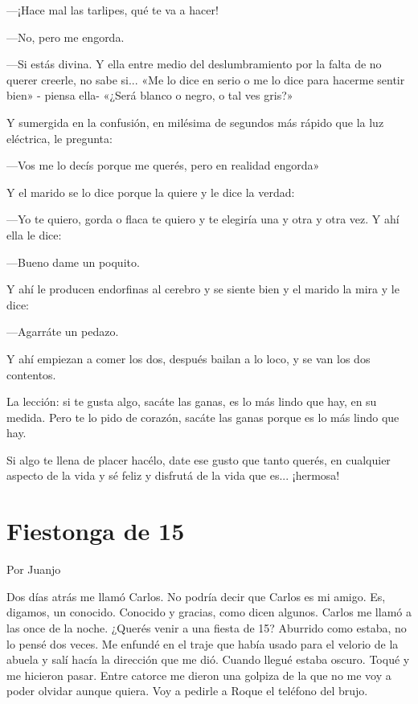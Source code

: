 \documentclass[11pt,twoside,openright,a5paper]{book}
\begin{document}
---¡Hace mal las tarlipes, qué te  va a hacer!

---No, pero me engorda.

---Si estás divina. Y  ella entre medio del deslumbramiento por la falta de no querer creerle, no sabe si... «Me  lo dice en serio o me lo dice para hacerme sentir bien» - piensa ella- «¿Será blanco o negro, o tal ves gris?»

Y sumergida en la confusión,  en milésima de segundos más rápido que la luz eléctrica, le pregunta:

---Vos me lo decís porque me querés,  pero en realidad engorda»

Y el marido se lo dice porque la quiere y le dice la verdad:

---Yo te quiero,  gorda o flaca te quiero y te elegiría  una y otra y otra vez. Y ahí ella le dice:

---Bueno dame un poquito.

Y ahí le producen endorfinas al cerebro y se siente bien y el marido la mira y le dice:

---Agarráte un pedazo.

Y ahí empiezan a comer los dos, después bailan a lo loco, y se van los dos contentos.

La lección: si te gusta algo, sacáte las  ganas,  es lo más lindo que hay,  en su medida. Pero te lo pido de corazón, sacáte las ganas porque es lo más lindo que hay.

Si algo te llena de placer hacélo, date ese gusto que tanto querés, en cualquier aspecto de la vida y sé feliz y disfrutá de la vida que es... ¡hermosa!


\section*{Fiestonga de 15 }

                                                                                        \begin{flushright}Por Juanjo\end{flushright}


Dos días atrás me llamó Carlos. No podría decir que Carlos es mi amigo. Es, digamos, un conocido. Conocido y gracias, como dicen algunos. Carlos me llamó a las once de la noche. ¿Querés venir a una fiesta de 15? Aburrido como estaba, no lo pensé dos veces. Me enfundé en el traje que había usado para el velorio de la abuela y salí hacía la dirección que me dió. Cuando llegué estaba oscuro. Toqué y me hicieron pasar. Entre catorce me dieron una golpiza de la que no me voy a poder olvidar aunque quiera. Voy a pedirle a Roque el teléfono del brujo.
\end{document}
